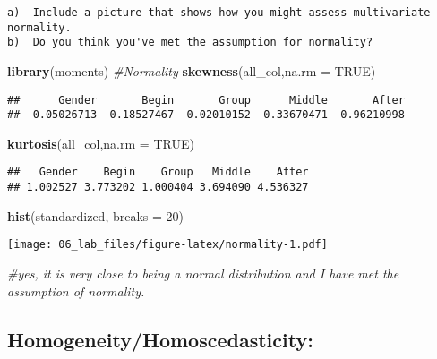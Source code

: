 \documentclass[
]{article}
\newenvironment{Shaded}{\begin{snugshade}}{\end{snugshade}}
\newcommand{\CommentTok}[1]{\textcolor[rgb]{0.56,0.35,0.01}{\textit{#1}}}
\newcommand{\DataTypeTok}[1]{\textcolor[rgb]{0.13,0.29,0.53}{#1}}
\newcommand{\DecValTok}[1]{\textcolor[rgb]{0.00,0.00,0.81}{#1}}
\newcommand{\KeywordTok}[1]{\textcolor[rgb]{0.13,0.29,0.53}{\textbf{#1}}}
\newcommand{\NormalTok}[1]{#1}
\newcommand{\OtherTok}[1]{\textcolor[rgb]{0.56,0.35,0.01}{#1}}
\begin{document}
\begin{verbatim}
a)  Include a picture that shows how you might assess multivariate normality.
b)  Do you think you've met the assumption for normality? 
\end{verbatim}

\begin{Shaded}
\begin{Highlighting}[]
\KeywordTok{library}\NormalTok{(moments)}
\CommentTok{#Normality}
\KeywordTok{skewness}\NormalTok{(all_col,}\DataTypeTok{na.rm =} \OtherTok{TRUE}\NormalTok{)}
\end{Highlighting}
\end{Shaded}

\begin{verbatim}
##      Gender       Begin       Group      Middle       After 
## -0.05026713  0.18527467 -0.02010152 -0.33670471 -0.96210998
\end{verbatim}

\begin{Shaded}
\begin{Highlighting}[]
\KeywordTok{kurtosis}\NormalTok{(all_col,}\DataTypeTok{na.rm =} \OtherTok{TRUE}\NormalTok{)}
\end{Highlighting}
\end{Shaded}

\begin{verbatim}
##   Gender    Begin    Group   Middle    After 
## 1.002527 3.773202 1.000404 3.694090 4.536327
\end{verbatim}

\begin{Shaded}
\begin{Highlighting}[]
\KeywordTok{hist}\NormalTok{(standardized, }\DataTypeTok{breaks =} \DecValTok{20}\NormalTok{)}
\end{Highlighting}
\end{Shaded}

\texttt{[image: 06\_lab\_files/figure-latex/normality-1.pdf]}

\begin{Shaded}
\begin{Highlighting}[]
\CommentTok{#yes, it is very close to being a normal distribution and I have met the assumption of normality.}
\end{Highlighting}
\end{Shaded}

\hypertarget{homogeneityhomoscedasticity}{%
\subsection{Homogeneity/Homoscedasticity:}\label{homogeneityhomoscedasticity}}
\end{document}
